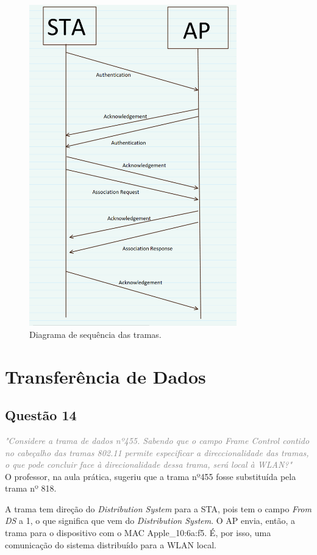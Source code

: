 \documentclass{llncs}
\newcommand{\questionE}[1]{\textcolor{gray}{\textit{"#1"}}}
\begin{document}
\begin{figure}[H]
\begin{center}
\includegraphics[width=9cm]{ass.PNG}
\end{center}
\caption{Diagrama de sequência das tramas.}
\end{figure}

\clearpage

\section{Transferência de Dados}

\subsection*{Questão 14}
\hspace{3mm} 
\questionE{Considere a trama de dados nº455. Sabendo que o campo Frame Control contido no cabeçalho das tramas 802.11 permite especificar a direccionalidade das tramas, o que pode concluir face à direcionalidade dessa trama, será local à WLAN?}\\ 

O professor, na aula prática, sugeriu que a trama nº455 fosse substituída pela trama nº 818.

A trama tem direção do \textit{Distribution System} para a STA, pois tem o campo \textit{From DS} a 1, o que significa que vem do \textit{Distribution System}. O AP envia, então, a trama para o dispositivo com o MAC Apple\_10:6a:f5. É, por isso, uma comunicação do sistema distribuído para a WLAN local.
\end{document}
